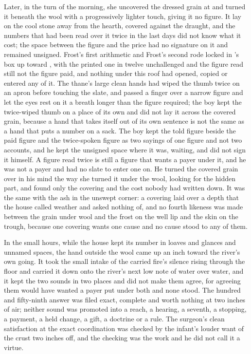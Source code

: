 \scenebreak

Later, in the turn of the morning, she uncovered the dressed grain at  and turned it beneath the wool with a progressively lighter touch, giving it no figure. It lay on the cool stone away from the hearth, covered against the draught, and the numbers that had been read over it twice in the last days did not know what it cost; the space between the figure and the price had no signature on it and remained unsigned. Frost's first arithmetic and Frost's second rode locked in 's box up  toward , with the printed one in twelve unchallenged and the figure read still not the figure paid, and nothing under this roof had opened, copied or entered any of it. The thane's large clean hands had wiped the thumb twice on an apron before touching the slate, and passed a finger over a narrow figure and let the eyes rest on it a breath longer than the figure required; the boy kept the twice-wiped thumb on a place of its own and did not lay it across the covered grain, because a hand that takes itself out of its own sentence is not the same as a hand that puts a number on a sack. The boy kept the told figure beside the paid figure and the twice-spoken figure as two sayings of one figure and not two accounts, and he kept the unsigned space where it was, waiting, and did not sign it himself. A figure read twice is still a figure that wants a payer under it, and he was not a payer and had no slate to enter one on. He turned the covered grain over in his mind the way she turned it under the wool, looking for the hidden part, and found only the covering and the cost nobody had written down. It was the same with the ash in the unswept corner: a covering laid over a depth that the house called weather and asked nothing of, and no fourth likeness was made between the grain under wool and the frost on the well lip and the skin on the trough, because one covering wants one cause and no cause stood to any of them.

\scenebreak

In the small hours, while the house kept its number in loaves and glances and unnamed spaces, the hand outside the wool came up an inch toward the river's own going. It took the small intake of the carried fire's silence rising through the floor and carried it down onto the river's next low note of water over water, and it kept the two sounds in two places and did not make them agree, for agreeing them would have wanted a payer put under both and none stood. The hundred and fifty-ninth answer was filed exact, complete and worth nothing at two inches of air; neither sound was promoted into a reach, a hearing, a seventh, a stopping, a payment, a held change, a gift, a doctrine or a rule. The surgeon's clean satisfaction at the exact coordination was checked by the infant's louder want of the crust two inches off, and the checking was the work and he did not call it a virtue.


